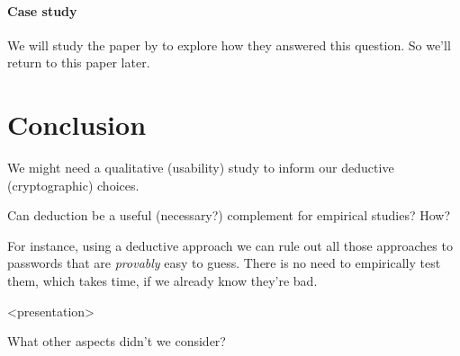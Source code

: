 
\paragraph{Case study}

We will study the paper by \textcite{WhyPhishingWorks} to explore how they 
answered this question.
So we'll return to this paper later.


\section{Conclusion}

\begin{frame}
  We might need a qualitative (\eg usability) study
  to inform our deductive (\eg cryptographic) choices.
\end{frame}

\begin{frame}
  \begin{question}
    Can deduction be a useful (necessary?) complement for empirical studies?
    How?
  \end{question}
\end{frame}

For instance, using a deductive approach we can rule out all those approaches 
to passwords that are \emph{provably} easy to guess.
There is no need to empirically test them, which takes time, if we already know 
they're bad.

\begin{frame}<presentation>
  \begin{exercise}
    What other aspects didn't we consider?
  \end{exercise}
\end{frame}
